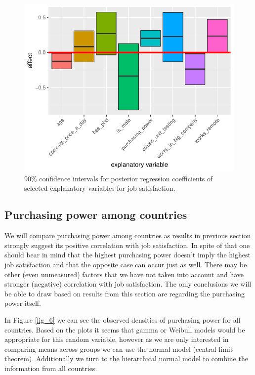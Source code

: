 \documentclass{article}
\begin{document}
\begin{figure}[H]
\centering
\includegraphics{report-021}
\caption{90\% confidence intervals for posterior regression coefficients of selected explanatory variables for job satisfaction.}\label{fig_5}
\end{figure}

\subsection{Purchasing power among countries}
We will compare purchasing power among countries as results in previous section strongly suggest its positive correlation with job satisfaction. In spite of that one should bear in mind that the highest purchasing power doesn't imply the highest job satisfaction and that the opposite case can occur just as well. There may be other (even unmeasured) factors that we have not taken into account and have stronger (negative) correlation with job satisfaction. The only conclusions we will be able to draw based on results from this section are regarding the purchasing power itself.

In Figure \ref{fig_6} we can see the observed densities of purchasing power for all countries. Based on the plots it seems that gamma or Weibull models would be appropriate for this random variable, however as we are only interested in comparing means across groups we can use the normal model (central limit theorem). Additionally we turn to the hierarchical normal model to combine the information from all countries.
\end{document}
